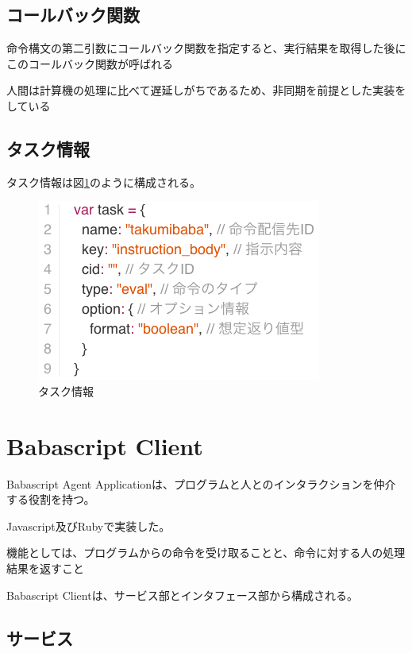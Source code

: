 \subsection{コールバック関数}

命令構文の第二引数にコールバック関数を指定すると、実行結果を取得した後にこのコールバック関数が呼ばれる

人間は計算機の処理に比べて遅延しがちであるため、非同期を前提とした実装をしている

\subsection{タスク情報}

タスク情報は図\ref{fig:task_format}のように構成される。

\begin{figure}[htbp]
  \begin{center}
  \includegraphics[width=.6\linewidth,bb=0 0 354 225]{images/task_format.js.png}
  \end{center}
  \caption{タスク情報}
  \label{fig:task_format}
\end{figure}

\section{Babascript Client}

Babascript Agent Applicationは、プログラムと人とのインタラクションを仲介する役割を持つ。

Javascript及びRubyで実装した。

機能としては、プログラムからの命令を受け取ることと、命令に対する人の処理結果を返すこと

Babascript Clientは、サービス部とインタフェース部から構成される。

\subsection{サービス}

